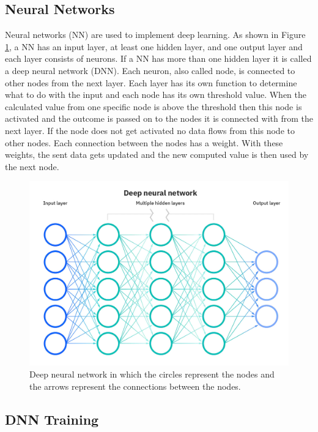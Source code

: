 \documentclass[conference]{IEEEtran}
\begin{document}
\vspace{\baselineskip}
\subsection{Neural Networks}

Neural networks (NN) are used to implement deep learning. As shown in Figure \ref{fig:neural-network}, a NN has an input layer, at least one hidden layer, and one output layer and each layer consists of neurons. If a NN has more than one hidden layer it is called a deep neural network (DNN). Each neuron, also called node, is connected to other nodes from the next layer. Each layer has its own function to determine what to do with the input and each node has its own threshold value. When the calculated value from one specific node is above the threshold then this node is activated and the outcome is passed on to the nodes it is connected with from the next layer. If the node does not get activated no data flows from this node to other nodes. Each connection between the nodes has a weight. With these weights, the sent data gets updated and the new computed value is then used by the next node.\cite{b10}

\begin{figure}[H]
    \centering
    \includegraphics[scale=0.18]{NeuralNetwork.jpg}
    \caption{Deep neural network in which the circles represent the nodes and the arrows represent the connections between the nodes. \cite{b10}}
    \label{fig:neural-network}
\end{figure}

\subsection{DNN Training}
\end{document}
